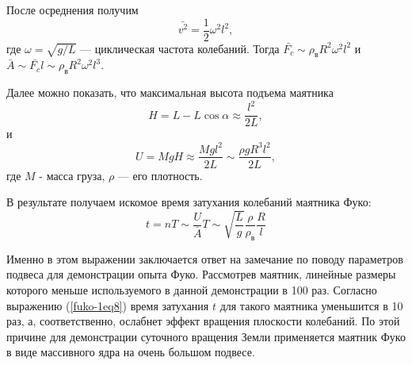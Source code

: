 \documentclass[14pt,a4paper,oneside]{extarticle}	%
\begin{document}
	После осреднения получим
	\begin{equation}\label{fuko-1eq5}
	\bar{v^{2}} = \frac{1}{2}\omega^{2}l^{2},
	\end{equation}
	где $ \omega = \sqrt{g/L} $ — циклическая частота колебаний.
	Тогда $ \bar{F_{c}}  \sim \rho_{\text{в}} R^{2}\omega^{2}l^{2} $ и $ \bar{A} \sim  \bar{F_{c}} l \sim \rho_{\text{в}} R^{2}\omega^{2}l^3 $.
	
	Далее можно показать, что максимальная высота подъема маятника
	\begin{equation}\label{fuko-1eq6}
	H = L - L \cos\alpha \approx \frac{l^{2}}{2L},
	\end{equation}
	и
	\begin{equation}\label{fuko-1eq7}
	U = MgH \approx \frac{ Mgl^2}{2L} \sim \frac{\rho g R^{3}l^{2}}{2L},
	\end{equation}
	где $ M $ - масса груза, $ \rho $ — его плотность. 
	
	В результате получаем искомое время затухания колебаний маятника Фуко:
	\begin{equation}\label{fuko-1eq8}
	t = nT \sim  \frac{U}{\bar{A}}T \sim\sqrt{\frac{L}{g}} \frac{\rho}{\rho_{\text{в}}}\frac{R}{l}
	\end{equation}
	
	Именно в этом выражении заключается ответ на замечание по поводу параметров подвеса для демонстрации опыта Фуко.
	Рассмотрев маятник, линейные размеры которого меньше используемого в данной демонстрации в 100 раз.
	Согласно выражению (\ref{fuko-1eq8}) время затухания $ t $ для такого маятника уменьшится в 10 раз, а, соответственно, ослабнет эффект вращения плоскости колебаний.
	По этой причине для демонстрации суточного вращения Земли применяется маятник Фуко в виде массивного ядра на очень большом подвесе.
	
\end{document}
